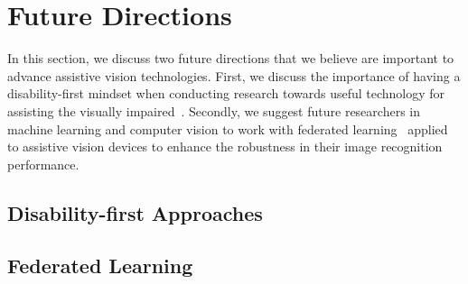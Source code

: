 \section{Future Directions}\label{chap5:sec:future_directions}

In this section, we discuss two future directions that we believe are important to advance assistive vision technologies. First, we discuss the importance of having a disability-first mindset when conducting research towards useful technology for assisting the visually impaired~\cite{theodorou2021disability}. Secondly, we suggest future researchers in machine learning and computer vision to work with federated learning~\cite{li2020federated} applied to assistive vision devices to enhance the robustness in their image recognition performance. 



\subsection{Disability-first Approaches}


\subsection{Federated Learning}




